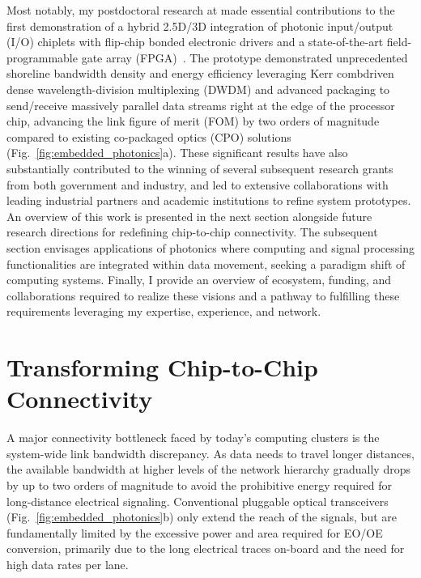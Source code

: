 Most notably, my postdoctoral research at \mySchoolShort{} made essential contributions to the first demonstration of a hybrid 2.5D/3D integration of photonic input/output (I/O) chiplets with
flip-chip bonded electronic drivers and a state-of-the-art field-programmable gate array (FPGA)~\cite{wangSiliconPhotonicsChip2024,wangCoDesignedSiliconPhotonics2024,RovinskiISCAS25}. The prototype demonstrated unprecedented shoreline bandwidth density and energy efficiency leveraging Kerr comb\textendash{}driven dense wavelength-division multiplexing (DWDM) and advanced packaging to send/receive massively parallel data streams right at the edge of the processor chip, advancing the link figure of merit (FOM) by two orders of magnitude compared to existing co-packaged optics (CPO) solutions (Fig.~\ref{fig:embedded_photonics}a). These significant results have also substantially contributed to the winning of several subsequent research grants from both government and industry, and led to extensive collaborations with leading industrial partners and academic institutions to refine system prototypes. An overview of this work is presented in the next section alongside future research directions for redefining chip-to-chip connectivity. The subsequent section envisages applications of photonics where computing and signal processing functionalities are integrated within data movement, seeking a paradigm shift of computing systems. Finally, I provide an overview of ecosystem, funding, and collaborations required to realize these visions and a pathway to fulfilling these requirements leveraging my expertise, experience, and network.

\section*{Transforming Chip-to-Chip Connectivity}

A major connectivity bottleneck faced by today's computing clusters is the system-wide link bandwidth discrepancy. As data needs to travel longer distances, the available bandwidth at higher levels of the network hierarchy gradually drops by up to two orders of magnitude to avoid the prohibitive energy required for long-distance electrical signaling. Conventional pluggable optical transceivers (Fig.~\ref{fig:embedded_photonics}b) only extend the reach of the signals, but are fundamentally limited by the excessive power and area required for EO/OE conversion, primarily due to the long electrical traces on-board and the need for high data rates per lane.

